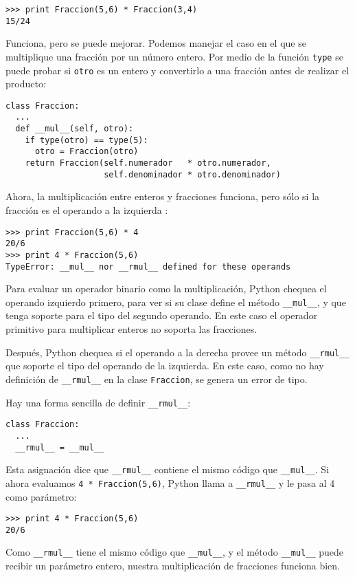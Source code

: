\beforeverb
\begin{verbatim}
>>> print Fraccion(5,6) * Fraccion(3,4)
15/24
\end{verbatim}
\afterverb
%
Funciona, pero se puede mejorar. Podemos manejar el caso en el 
que se multiplique una fracción por un número entero. Por medio
de la función \texttt{type} se puede probar si \texttt{otro} es
un entero y convertirlo a una fracción antes de realizar el
producto:

\beforeverb
\begin{verbatim}
class Fraccion:
  ...
  def __mul__(self, otro):
    if type(otro) == type(5):
      otro = Fraccion(otro)
    return Fraccion(self.numerador   * otro.numerador,
                    self.denominador * otro.denominador)
\end{verbatim}
\afterverb
%
Ahora, la multiplicación entre enteros y fracciones funciona, pero 
sólo si la fracción es el operando a la izquierda :

\beforeverb
\begin{verbatim}
>>> print Fraccion(5,6) * 4
20/6
>>> print 4 * Fraccion(5,6)
TypeError: __mul__ nor __rmul__ defined for these operands
\end{verbatim}
\afterverb
%
Para evaluar un operador binario como la multiplicación, Python
chequea el operando izquierdo primero, para ver si su clase 
define el método  \texttt{\_\_mul\_\_}, y que tenga soporte para
el tipo del segundo operando. En este caso el operador primitivo
para multiplicar enteros no soporta las fracciones.

Después, Python chequea si el operando a la derecha provee un 
método  \texttt{\_\_rmul\_\_} que soporte el tipo del operando de
la izquierda.  En este caso, como no hay definición de  \texttt{\_\_rmul\_\_} en la clase \texttt{Fraccion}, se genera
un error de tipo. 

Hay una forma sencilla de definir \texttt{\_\_rmul\_\_}:

\beforeverb
\begin{verbatim}
class Fraccion:
  ...
  __rmul__ = __mul__
\end{verbatim}
\afterverb
%
Esta asignación dice que  \texttt{\_\_rmul\_\_} contiene el mismo
código que \texttt{\_\_mul\_\_}. Si ahora evaluamos 
\texttt{4 * Fraccion(5,6)}, Python llama a \texttt{\_\_rmul\_\_} y le pasa
al 4 como parámetro:

\beforeverb
\begin{verbatim}
>>> print 4 * Fraccion(5,6)
20/6
\end{verbatim}
\afterverb
%
Como  \texttt{\_\_rmul\_\_} tiene el mismo código que  \texttt{\_\_mul\_\_}, 
y el método \texttt{\_\_mul\_\_} puede recibir un parámetro entero, 
nuestra multiplicación de fracciones funciona bien.


